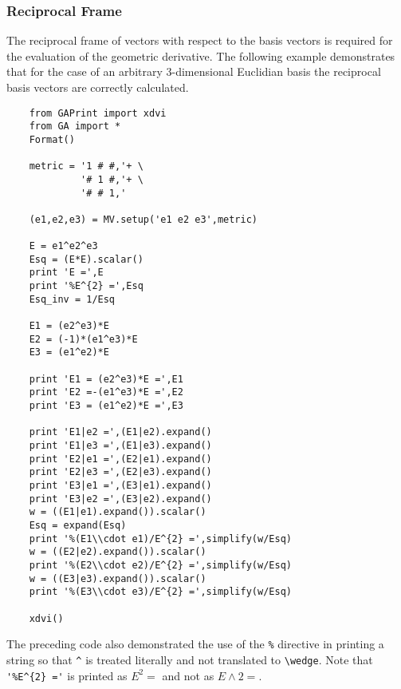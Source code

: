 \documentclass[10pt]{article}
\newcommand{\W}{\wedge}
\newcommand{\T}[1]{\texttt{#1}}
\begin{document}
\subsubsection{Reciprocal Frame}

The reciprocal frame of vectors with respect to the basis vectors is required
for the evaluation of the geometric derivative.  The following example demonstrates
that for the case of an arbitrary 3-dimensional Euclidian basis the reciprocal
basis vectors are correctly calculated.

\begin{lstlisting}
    from GAPrint import xdvi
    from GA import *
    Format()

    metric = '1 # #,'+ \
             '# 1 #,'+ \
             '# # 1,'

    (e1,e2,e3) = MV.setup('e1 e2 e3',metric)

    E = e1^e2^e3
    Esq = (E*E).scalar()
    print 'E =',E
    print '%E^{2} =',Esq
    Esq_inv = 1/Esq

    E1 = (e2^e3)*E
    E2 = (-1)*(e1^e3)*E
    E3 = (e1^e2)*E

    print 'E1 = (e2^e3)*E =',E1
    print 'E2 =-(e1^e3)*E =',E2
    print 'E3 = (e1^e2)*E =',E3

    print 'E1|e2 =',(E1|e2).expand()
    print 'E1|e3 =',(E1|e3).expand()
    print 'E2|e1 =',(E2|e1).expand()
    print 'E2|e3 =',(E2|e3).expand()
    print 'E3|e1 =',(E3|e1).expand()
    print 'E3|e2 =',(E3|e2).expand()
    w = ((E1|e1).expand()).scalar()
    Esq = expand(Esq)
    print '%(E1\\cdot e1)/E^{2} =',simplify(w/Esq)
    w = ((E2|e2).expand()).scalar()
    print '%(E2\\cdot e2)/E^{2} =',simplify(w/Esq)
    w = ((E3|e3).expand()).scalar()
    print '%(E3\\cdot e3)/E^{2} =',simplify(w/Esq)

    xdvi()
\end{lstlisting}

 The preceding code also demonstrated the use of the \T{\%} directive in
printing a string so that \T{\^} is treated literally and not translated
to \lstinline!\wedge!. Note that \lstinline!'%E^{2} ='! is printed as $E^{2} =$
and not as $E\W {2} =$.
\end{document}
